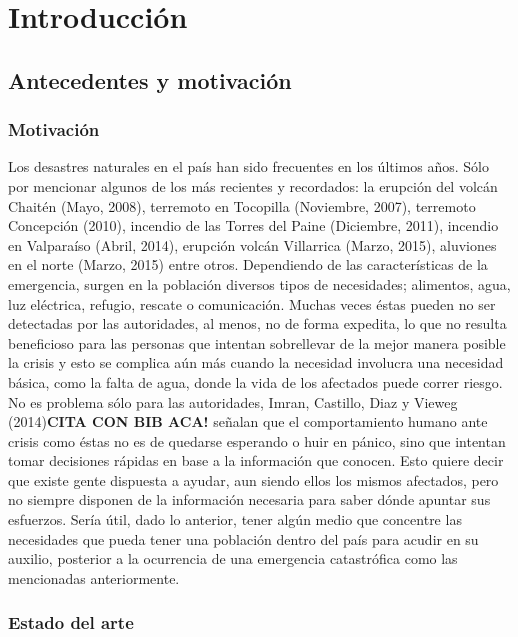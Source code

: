 \chapter{Introducci\'on}
\label{cap:introduccion}

\section{Antecedentes y motivaci\'on}
\label{intro:motivacion}

\subsection{Motivación}
\label{intro:motivacion:motivacion}

Los desastres naturales en el país han sido frecuentes en los últimos años. Sólo por mencionar algunos de los más recientes y recordados: la erupción del volcán Chaitén (Mayo, 2008), terremoto en Tocopilla (Noviembre, 2007), terremoto Concepción (2010), incendio de las Torres del Paine (Diciembre, 2011), incendio en Valparaíso (Abril, 2014), erupción volcán Villarrica (Marzo, 2015), aluviones en el norte (Marzo, 2015) entre otros. Dependiendo de las características de la emergencia, surgen en la población diversos tipos de necesidades; alimentos, agua, luz eléctrica, refugio, rescate o comunicación. Muchas veces éstas pueden no ser detectadas por las autoridades, al menos, no de forma expedita, lo que no resulta beneficioso para las personas que intentan sobrellevar de la mejor manera posible la crisis y esto se complica aún más cuando la necesidad involucra una necesidad básica, como la falta de agua, donde la vida de los afectados puede correr riesgo. No es problema sólo para las autoridades, Imran, Castillo, Diaz y Vieweg (2014)\textbf{CITA CON BIB ACA!} señalan que el comportamiento humano ante crisis como éstas no es de quedarse esperando o huir en pánico, sino que intentan tomar decisiones rápidas en base a la información que conocen. Esto quiere decir que existe gente dispuesta a ayudar, aun siendo ellos los mismos afectados, pero no siempre disponen de la información necesaria para saber dónde apuntar sus esfuerzos. Sería útil, dado lo anterior, tener algún medio que concentre las necesidades que pueda tener una población dentro del país para acudir en su auxilio, posterior a la ocurrencia de una emergencia catastrófica como las mencionadas anteriormente.

\subsection{Estado del arte}
\label{intro:motivacion:arte}

